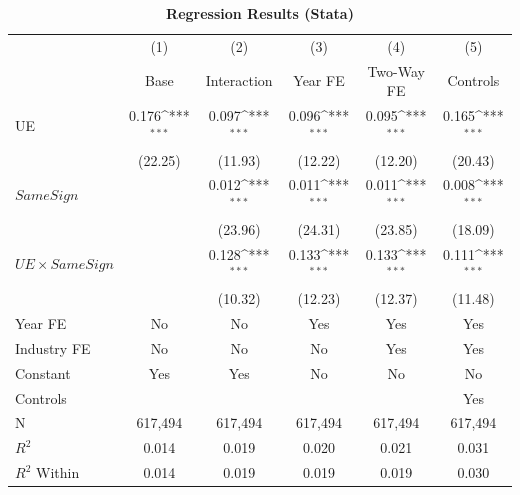 \documentclass[english,12pt]{article}
\begin{document}
\begin{table}[htbp]\centering\footnotesize{
\def\sym#1{\ifmmode^{#1}\else\(^{#1}\)\fi}
\caption{\textbf{Regression Results (Stata)} \label{tab:regress-stata}}

\begin{tabular}{l*{5}{c}}
\toprule
                &\multicolumn{1}{c}{(1)}&\multicolumn{1}{c}{(2)}&\multicolumn{1}{c}{(3)}&\multicolumn{1}{c}{(4)}&\multicolumn{1}{c}{(5)}\\
                &\multicolumn{1}{c}{Base}&\multicolumn{1}{c}{Interaction}&\multicolumn{1}{c}{Year FE}&\multicolumn{1}{c}{Two-Way FE}&\multicolumn{1}{c}{Controls}\\
\midrule
UE             &    0.176\sym{***}&    0.097\sym{***}&    0.096\sym{***}&    0.095\sym{***}&    0.165\sym{***}\\
                &  (22.25)              &  (11.93)              &  (12.22)              &  (12.20)              &  (20.43)              \\
$SameSign$      &                       &    0.012\sym{***}&    0.011\sym{***}&    0.011\sym{***}&    0.008\sym{***}\\
                &                       &  (23.96)              &  (24.31)              &  (23.85)              &  (18.09)              \\
$UE \times SameSign$&                       &    0.128\sym{***}&    0.133\sym{***}&    0.133\sym{***}&    0.111\sym{***}\\
                &                       &  (10.32)              &  (12.23)              &  (12.37)              &  (11.48)              \\
Year FE         &       No              &       No              &      Yes              &      Yes              &      Yes              \\
Industry FE     &       No              &       No              &       No              &      Yes              &      Yes              \\
Constant        &      Yes              &      Yes              &       No              &       No              &       No              \\
\midrule
Controls        &                       &                       &                       &                       &      Yes              \\
N               &  617,494              &  617,494              &  617,494              &  617,494              &  617,494              \\
$R^2$           &    0.014              &    0.019              &    0.020              &    0.021              &    0.031              \\
$R^2$ Within    &    0.014              &    0.019              &    0.019              &    0.019              &    0.030              \\
\bottomrule
\end{tabular}

}
\end{table}
\end{document}
